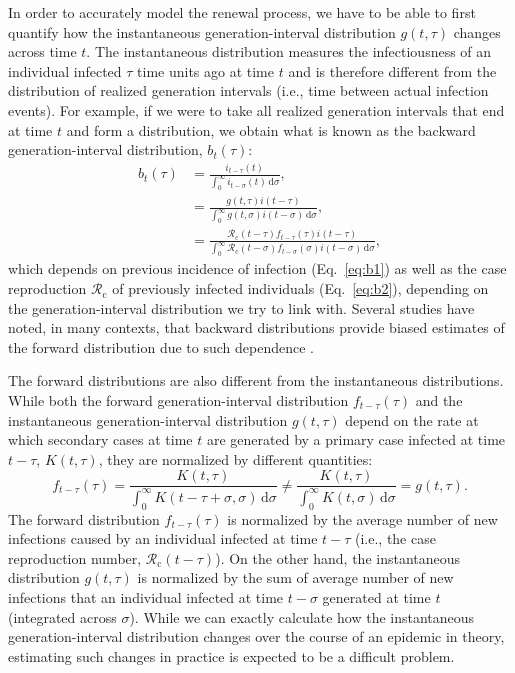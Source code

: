 \documentclass[12pt]{article}
\newcommand{\eref}[1]{Eq.~\ref{eq:#1}}
\newcommand{\Rx}[1]{\ensuremath{{\mathcal R}_{#1}}\xspace}
\newcommand{\Rc}{\Rx{\mathrm{c}}}
\newcommand{\dd}[1]{\ensuremath{\, \mathrm{d}#1}}
\newcommand{\dsigma}{\dd{\sigma}}
\begin{document}
In order to accurately model the renewal process, we have to be able to first quantify how the instantaneous generation-interval distribution $g(t, \tau)$ changes across time $t$.
The instantaneous distribution measures the infectiousness of an individual infected $\tau$ time units ago at time $t$ and is therefore different from the distribution of realized generation intervals (i.e., time between actual infection events).
For example, if we were to take all realized generation intervals that end at time $t$ and form a distribution, we obtain what is known as the backward generation-interval distribution, $b_t(\tau)$:
\begin{align}
b_t(\tau) &= \frac{i_{t-\tau}(t)}{\int_0^\infty i_{t-\sigma}(t) \dsigma},\label{eq:backward}\\
&= \frac{g(t,\tau) i(t-\tau)}{\int_0^\infty g(t,\sigma) i(t-\sigma) \dsigma},\label{eq:b1}\\
&= \frac{\Rc(t-\tau) f_{t-\tau}(\tau) i(t-\tau)}{\int_0^\infty \Rc(t-\sigma) f_{t-\sigma}(\sigma) i(t-\sigma) \dsigma},\label{eq:b2}
\end{align}
which depends on previous incidence of infection (\eref{b1}) as well as the case reproduction $\Rc$ of previously infected individuals (\eref{b2}), depending on the generation-interval distribution we try to link with.
Several studies have noted, in many contexts, that backward distributions provide biased estimates of the forward distribution due to such dependence \citep{nishiura2010time,champredon2015intrinsic,park2020inferring,park2020forward}.

The forward distributions are also different from the instantaneous distributions.
While both the forward generation-interval distribution $f_{t-\tau}(\tau)$ and the instantaneous generation-interval distribution $g(t, \tau)$ depend on the rate at which secondary cases at time $t$ are generated by a primary case infected at time $t-\tau$, $K(t, \tau)$, they are normalized by different quantities:
\begin{equation}
f_{t-\tau}(\tau) = \frac{K(t,\tau)}{\int_0^\infty K(t-\tau+\sigma,\sigma) \dsigma} \neq \frac{K(t,\tau)}{\int_0^\infty K(t,\sigma) \dsigma} = g(t, \tau).
\end{equation}
The forward distribution $f_{t-\tau}(\tau)$ is normalized by the average number of new infections caused by an individual infected at time $t-\tau$ (i.e., the case reproduction number, $\Rc(t-\tau)$).
On the other hand, the instantaneous distribution $g(t, \tau)$ is normalized by the sum of average number of new infections that an individual infected at time $t-\sigma$ generated at time $t$ (integrated across $\sigma$).
While we can exactly calculate how the instantaneous generation-interval distribution changes over the course of an epidemic in theory, estimating such changes in practice is expected to be a difficult problem.
\end{document}
